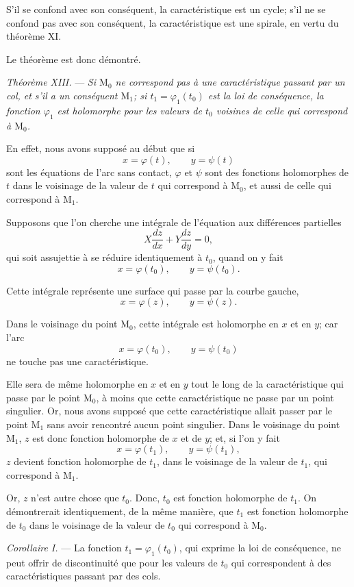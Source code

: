 \documentclass[11pt]{article}
\begin{document}
S'il se confond avec son conséquent, la caractéristique est un cycle; s'il ne se confond pas avec son conséquent, la caractéristique est une spirale, en vertu du théorème XI.

Le théorème est donc démontré.

\emph{Théorème XIII.} --- \emph{Si $\mathrm M_0$ ne correspond pas à une caractéristique passant par un col, et s'il a un conséquent $\mathrm M_1$; si $t_1=\varphi_1(t_0)$ est la loi de conséquence, la fonction $\varphi_1$ est holomorphe pour les valeurs de $t_0$ voisines de celle qui correspond à $\mathrm M_0$.}

En effet, nous avons supposé au début que si
\[
x=\varphi(t),\qquad y=\psi(t)
\]
sont les équations de l'arc sans contact, $\varphi$ et $\psi$ sont des fonctions holomorphes de $t$ dans le voisinage de la valeur de $t$ qui correspond à $\mathrm M_0$, et aussi de celle qui correspond à $\mathrm M_1$.

Supposons que l'on cherche une intégrale de l'équation aux différences partielles
\[
X\frac{dz}{dx}+Y\frac{dz}{dy}=0,
\]
qui soit assujettie à se réduire identiquement à $t_0$, quand on y fait
\[
x=\varphi(t_0),\qquad y=\psi(t_0).
\]

Cette intégrale représente une surface qui passe par la courbe gauche,
\[
x=\varphi(z),\qquad y=\psi(z).
\]

Dans le voisinage du point $\mathrm M_0$, cette intégrale est holomorphe en $x$ et en $y$; car l'arc
\[
x=\varphi(t_0),\qquad y=\psi(t_0)
\]
ne touche pas une caractéristique.

Elle sera de même holomorphe en $x$ et en $y$ tout le long de la caractéristique qui passe par le point $\mathrm M_0$, à moins que cette caractéristique ne passe par un point singulier. Or, nous avons supposé que cette caractéristique allait passer par le point $\mathrm M_1$ sans avoir rencontré aucun point singulier. Dans le voisinage du point $\mathrm M_1$, $z$ est donc fonction holomorphe de $x$ et de $y$; et, si l'on y fait
\[
x=\varphi(t_1),\qquad y=\psi(t_1),
\]
$z$ devient fonction holomorphe de $t_1$, dans le voisinage de la valeur de $t_1$, qui correspond à $\mathrm M_1$.

Or, $z$ n'est autre chose que $t_0$. Donc, $t_0$ est fonction holomorphe de $t_1$. On démontrerait identiquement, de la même manière, que $t_1$ est fonction holomorphe de $t_0$ dans le voisinage de la valeur de $t_0$ qui correspond à $\mathrm M_0$.

\emph{Corollaire I.} --- La fonction $t_1=\varphi_1(t_0)$, qui exprime la loi de conséquence, ne peut offrir de discontinuité que pour les valeurs de $t_0$ qui correspondent à des caractéristiques passant par des cols.
\end{document}
